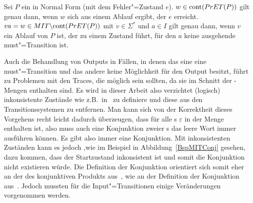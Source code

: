\begin{Lem}
  \label{FehlerAblaufNFLem}
  Sei $P$ ein \MEIO{} in Normal Form (mit dem Fehler"=Zustand $e$). $w\in
  \mathrm{cont} (PrET (P)) $ gilt genau dann, wenn $w$ sich aus einem Ablauf ergibt,
  der $e$ erreicht. $va = w\in MIT \backslash \mathrm{cont}(PrET (P))$ mit $v\in
  \Sigma ^*$ und $a\in I$ gilt genau dann, wenn $v$ ein Ablauf von $P$ ist, der
  zu einem Zustand führt, für den $a$ keine ausgehende must"=Transition ist.
\end{Lem}

Auch die Behandlung von Outputs in Fällen, in denen das eine \MEIO{} eine
must"=Transition und das andere keine Möglichkeit für den Output besitzt, führt
zu Problemen mit den Traces, die möglich sein sollten, da sie im Schnitt der
\EL{}-Mengen enthalten sind. Es wird in dieser Arbeit also verzichtet (logisch)
inkonsistente Zustände wie z.B.\ in~\cite{Vogler2016MIA3} zu definiere und
diese aus den Transitionssystemen zu entfernen. Man kann sich von der
Korrektheit dieses Vorgehens recht leicht dadurch überzeugen, dass für alle
\MEIO{}s $\varepsilon$ in der Menge \EL{} enthalten ist, also muss auch eine
Konjunktion zweier \MEIO{}s das leere Wort immer ausführen können. Es gibt also
immer eine Konjunktion. Mit inkonsistenten Zuständen kann es jedoch ,wie im
Beispiel in Abbildung~\ref{BspMITConj} gesehen, dazu kommen, dass der
Startzustand inkonsistent ist und somit die Konjunktion nicht existieren würde.
Die Definition der Konjunktion orientiert sich somit eher an der des
konjunktiven Produkts aus~\cite{Vogler2016MIA3}, wie an der Definition der
Konjunktion aus~\cite{Vogler2016MIA3}. Jedoch mussten für die
Input"=Transitionen einige Veränderungen vorgenommen werden.

